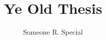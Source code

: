 \documentclass[11pt,final,palatino,thesis,actual]{uhthesis2e} %
\newlength\doublespacelength
\newcommand\startdoublespace{\setlength\baselineskip{\doublespacelength}}
\begin{document}
\title{Ye Old Thesis}
\author{Someone R. Special}

\maketitle

\begin{frontmatter}

\signaturepage %
\copyrightpage %
\tableofcontents %
\listoftables %
\listoffigures %

\end{frontmatter}

\end{document}
